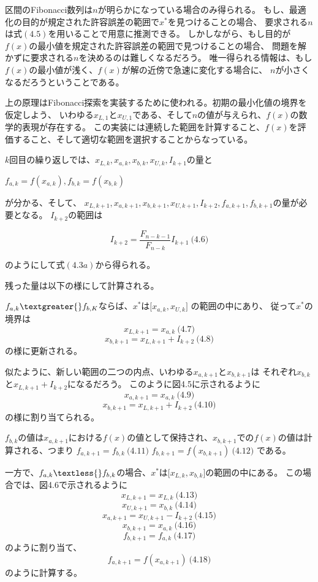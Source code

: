 区間のFibonacci数列は$n$が明らかになっている場合のみ得られる。
もし、最適化の目的が規定された許容誤差の範囲で$x^{\ast}$を見つけることの場合、
要求される$n$は式$(4.5)$を用いることで用意に推測できる。
しかしながら、もし目的が$f(x)$の最小値を規定された許容誤差の範囲で見つけることの場合、
問題を解かずに要求される$n$を決めるのは難しくなるだろう。
唯一得られる情報は、もし$f(x)$の最小値が浅く、$f(x)$が解の近傍で急速に変化する場合に、
$n$が小さくなるだろうということである。

上の原理はFibonacci探索を実装するために使われる。初期の最小化値の境界を仮定しよう、
いわゆる$x_{L,1}$と$x_{U,1}$である、そして$n$の値が与えられ、$f(x)$の数学的表現が存在する。
この実装には連続した範囲を計算すること、$f(x)$を評価すること、そして適切な範囲を選択することからなっている。

$k$回目の繰り返しでは、$x_{L,k}, x_{a,k}, x_{b,k},
x_{U,k}, I_{k+1}$の量と

$f_{a,k} = f(x_{a,k}), f_{b,k} = f(x_{b,k})$

が分かる、そして、 $x_{L,k+1}, x_{a,k+1}, x_{b,k+1},
x_{U,k+1}, I_{k+2}, f_{a,k+1}, f_{b,k+1}$の量が必要となる。
$I_{k+2}$の範囲は

$$I_{k+2} =
\frac{F_{n-k-1}}{F_{n-k}}I_{k+1}
\ \text{(4.6)}$$

のようにして式$(4.3a)$から得られる。

残った量は以下の様にして計算される。

$f_{a,k} \textgreater{}
f_{b,K}$ならば、$x^{\ast}$は$\lbrack
x_{a,k} , x_{U,k} \rbrack$ の範囲の中にあり、
従って$x^{\ast}$の境界は $$x_{L,k+1} =
x_{a,k} \ \text{(4.7)}$$ $$x_{b,k+1} = x_{L,k+1} +
I_{k+2} \ \text{(4.8)}$$ の様に更新される。

似たように、新しい範囲の二つの内点、いわゆる$x_{a,k+1}$と$x_{b,k+1}$は
それぞれ$x_{b,k}$と$x_{L,k+1} + I_{k+2}$になるだろう。
このように図4.5に示されるように $$x_{a, k+1} = x_{a,k}
\ \text{(4.9)}$$ $$x_{b, k+1} = x_{L,k+1} + I_{k+2}
\ \text{(4.10)}$$ の様に割り当てられる。

$f_{b,k}$の値は$x_{a,k+1}$における$f(x)$の値として保持され、$x_{b,k+1}$での$f(x)$の値は計算される、つまり
$f_{a,k+1} = f_{b,k} \ \text{(4.11)}$ $f_{b,k+1}
= f(x_{b,k+1}) \ \text{(4.12)}$ である。

一方で、$f_{a,k} \textless{}
f_{b,k}$の場合、$x^{\ast}$は$\lbrack
x_{L,k}, x_{b,k} \rbrack$の範囲の中にある。
この場合では、図4.6で示されるように $$x_{L,k+1} = x_{L,k}
\ \text{(4.13)}$$ $$x_{U,k+1} = x_{b,k}
\ \text{(4.14)}$$ $$x_{a,k+1} = x_{U,k+1} - I_{k+2}
\ \text{(4.15)}$$ $$x_{b,k+1} = x_{a,k}
\ \text{(4.16)}$$ $$f_{b,k+1} = f_{a,k}
\ \text{(4.17)}$$ のように割り当て、 $$f_{a,k+1} =
f(x_{a,k+1}) \ \text{(4.18)}$$ のように計算する。

